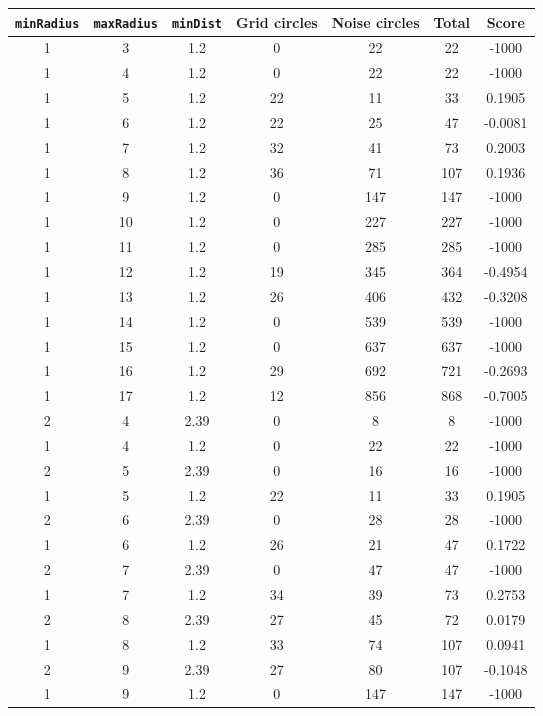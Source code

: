 \documentclass[letterpaper, 12pt]{article}
\begin{document}
\begin{longtable}{|c|c|c|c|c|c|c|}
\hline
\textbf{\texttt{minRadius}} & \textbf{\texttt{maxRadius}} & \textbf{\texttt{minDist}} & \textbf{Grid circles} & \textbf{Noise circles} & \textbf{Total} & \textbf{Score} \\
\hline
1 & 3 & 1.2 & 0 & 22 & 22 & -1000 \\
\hline
1 & 4 & 1.2 & 0 & 22 & 22 & -1000 \\
\hline
1 & 5 & 1.2 & 22 & 11 & 33 & 0.1905 \\
\hline
1 & 6 & 1.2 & 22 & 25 & 47 & -0.0081 \\
\hline
1 & 7 & 1.2 & 32 & 41 & 73 & 0.2003 \\
\hline
1 & 8 & 1.2 & 36 & 71 & 107 & 0.1936 \\
\hline
1 & 9 & 1.2 & 0 & 147 & 147 & -1000 \\
\hline
1 & 10 & 1.2 & 0 & 227 & 227 & -1000 \\
\hline
1 & 11 & 1.2 & 0 & 285 & 285 & -1000 \\
\hline
1 & 12 & 1.2 & 19 & 345 & 364 & -0.4954 \\
\hline
1 & 13 & 1.2 & 26 & 406 & 432 & -0.3208 \\
\hline
1 & 14 & 1.2 & 0 & 539 & 539 & -1000 \\
\hline
1 & 15 & 1.2 & 0 & 637 & 637 & -1000 \\
\hline
1 & 16 & 1.2 & 29 & 692 & 721 & -0.2693 \\
\hline
1 & 17 & 1.2 & 12 & 856 & 868 & -0.7005 \\
\hline
2 & 4 & 2.39 & 0 & 8 & 8 & -1000 \\
\hline
1 & 4 & 1.2 & 0 & 22 & 22 & -1000 \\
\hline
2 & 5 & 2.39 & 0 & 16 & 16 & -1000 \\
\hline
1 & 5 & 1.2 & 22 & 11 & 33 & 0.1905 \\
\hline
2 & 6 & 2.39 & 0 & 28 & 28 & -1000 \\
\hline
1 & 6 & 1.2 & 26 & 21 & 47 & 0.1722 \\
\hline
2 & 7 & 2.39 & 0 & 47 & 47 & -1000 \\
\hline
1 & 7 & 1.2 & 34 & 39 & 73 & 0.2753 \\
\hline
2 & 8 & 2.39 & 27 & 45 & 72 & 0.0179 \\
\hline
1 & 8 & 1.2 & 33 & 74 & 107 & 0.0941 \\
\hline
2 & 9 & 2.39 & 27 & 80 & 107 & -0.1048 \\
\hline
1 & 9 & 1.2 & 0 & 147 & 147 & -1000 \\

\end{longtable}
\end{document}
